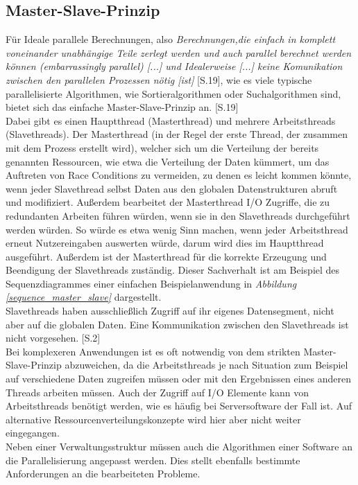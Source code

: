 \subsection{Master-Slave-Prinzip}
Für Ideale parallele Berechnungen, also \textit{\glqq Berechnungen,die einfach in komplett voneinander unabhängige Teile zerlegt werden und auch parallel berechnet werden können (embarrassingly parallel) [...] und Idealerweise [...] keine Komunikation zwischen den parallelen Prozessen nötig [ist] \grqq} \cite{Zeindl_Parallel_Programming}[S.19], wie es viele typische parallelisierte Algorithmen, wie Sortieralgorithmen oder Suchalgorithmen sind, bietet sich das einfache Master-Slave-Prinzip an. \cite{Zeindl_Parallel_Programming}[S.19]\\
Dabei gibt es einen Hauptthread (Masterthread) und mehrere Arbeitsthreads (Slavethreads). Der Masterthread (in der Regel der erste Thread, der zusammen mit dem Prozess erstellt wird), welcher sich um die Verteilung der bereits genannten Ressourcen, wie etwa die Verteilung der Daten kümmert, um das Auftreten von Race Conditions zu vermeiden, zu denen es leicht kommen könnte, wenn jeder Slavethread selbst Daten aus den globalen Datenstrukturen abruft und modifiziert. Außerdem bearbeitet der Masterthread \ac{I/O} Zugriffe, die zu redundanten Arbeiten führen würden, wenn sie in den Slavethreads durchgeführt werden würden. So würde es etwa wenig Sinn machen, wenn jeder Arbeitsthread erneut Nutzereingaben auswerten würde, darum wird dies im Hauptthread ausgeführt. Außerdem ist der Masterthread für die korrekte Erzeugung und Beendigung der Slavethreads zuständig. Dieser Sachverhalt ist am Beispiel des Sequenzdiagrammes einer einfachen Beispielanwendung in \textit{Abbildung  \ref{sequence_master_slave}} dargestellt.\\
Slavethreads haben ausschließlich Zugriff auf ihr eigenes Datensegment, nicht aber auf die globalen Daten. Eine Kommunikation zwischen den Slavethreads ist nicht vorgesehen. \cite{Bugner_Parallele_Programmierung}[S.2]\\[0.25 cm]
Bei komplexeren Anwendungen ist es oft notwendig von dem strikten Master-Slave-Prinzip abzuweichen, da die Arbeitsthreads je nach Situation zum Beispiel auf verschiedene Daten zugreifen müssen oder mit den Ergebnissen eines anderen Threads arbeiten müssen. Auch der Zugriff auf \ac{I/O} Elemente kann von Arbeitsthreads benötigt werden, wie es häufig bei Serversoftware der Fall ist. Auf alternative Ressourcenverteilungskonzepte wird hier aber nicht weiter eingegangen.\\
Neben einer Verwaltungsstruktur müssen auch die Algorithmen einer Software an die Parallelisierung angepasst werden. Dies stellt ebenfalls bestimmte Anforderungen an die bearbeiteten Probleme.

